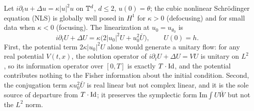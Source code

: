 Let $i\partial_tu+\Delta u=\kappa|u|^2u$ on $\mathbb{T}^d$, $d\le2$, $u(0)=\theta$; the cubic nonlinear Schr\"odinger equation (NLS) is globally well posed in $H^1$ for $\kappa>0$ (defocusing) and for small data when $\kappa<0$ (focusing). The linearization at $u_0=u_{\theta_0}$ is
\begin{equation}\label{m:eq:nlslin}
i\partial_tU+\Delta U=\kappa\big(2|u_0|^2U+u_0^2\bar U\big),\qquad U(0)=h .
\end{equation}
First, the potential term $2\kappa|u_0|^2U$ alone would generate a unitary flow: for any real potential $V(t,x)$, the solution operator of $i\partial_tU+\Delta U=VU$ is unitary on $L^2$, so its information operator over $[0,T]$ is exactly $T\cdot\operatorname{Id}$, and the potential contributes nothing to the Fisher information about the initial condition. Second, the conjugation term $\kappa u_0^2\bar U$ is real linear but not complex linear, and it is the sole source of departure from $T\cdot\operatorname{Id}$; it preserves the symplectic form $\mathrm{Im}\int U\bar W$ but not the $L^2$ norm.

